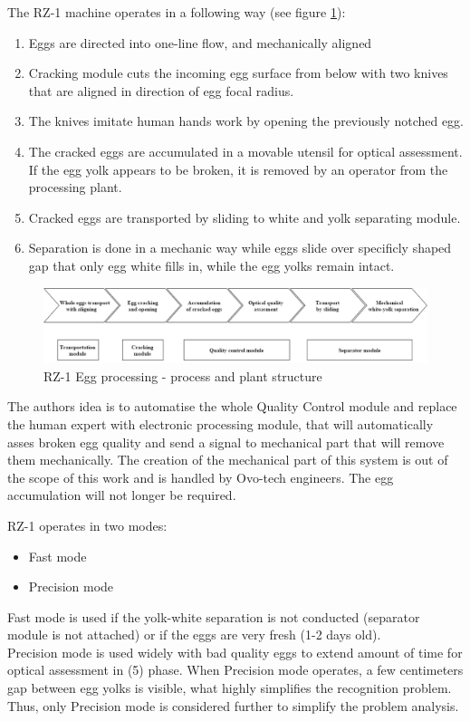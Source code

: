\documentclass[12pt,twoside,a4paper]{article}
\begin{document}
\newpage
The RZ-1 machine operates in a following way (see figure \ref{fig:process}):
\begin{enumerate}
\item Eggs are directed into one-line flow, and mechanically aligned

\item Cracking module cuts the incoming egg surface from below with two knives that are aligned in direction of egg focal radius.
\item The knives imitate human hands work by opening the previously notched egg.
\item The cracked eggs are accumulated in a movable utensil for optical assessment. 
If the egg yolk appears to be broken, it is removed by an operator from the processing plant.
\item Cracked eggs are transported by sliding to white and yolk separating module.
\item Separation  is done in a mechanic way while eggs slide over specificly shaped gap that only egg white fills in, while the egg yolks remain intact.
\end{enumerate}

\begin{figure}[H]
\centering
\includegraphics[width=0.8\paperwidth]{process}
\caption{RZ-1 Egg processing  - process and plant structure}\label{fig:process}
\end{figure}

The authors idea is to automatise the whole Quality Control module and replace the human expert with electronic processing module, that will automatically asses broken egg quality and send a signal to mechanical part that will remove them mechanically.
The creation of the mechanical part of this system is out of the scope of this work and is handled by Ovo-tech engineers.
The egg accumulation will not longer be required.

RZ-1 operates in two modes:
\begin{itemize}
\item Fast mode
\item Precision mode
\end{itemize}

Fast mode is used if the yolk-white separation is not conducted (separator module is not attached) or if the eggs are very fresh (1-2 days old).\\
Precision mode is used widely with bad quality eggs to extend amount of time for optical assessment in (5) phase.
When Precision mode operates, a few centimeters gap between egg yolks is visible, what highly simplifies the recognition problem. Thus, only Precision mode is considered further to simplify the problem analysis.
\end{document}
